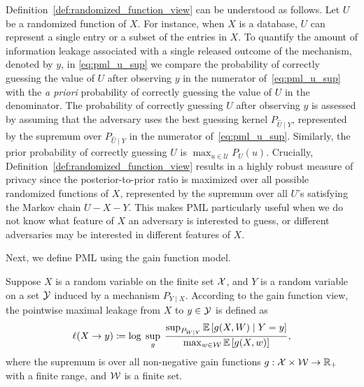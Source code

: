 Definition~\ref{def:randomized_function_view} can be understood as follows. Let $U$ be a randomized function of $X$. For instance, when $X$ is a database, $U$ can represent a single entry or a subset of the entries in $X$. To quantify the amount of information leakage associated with a single released outcome of the mechanism, denoted by $y$, in \eqref{eq:pml_u_sup} we compare the probability of correctly guessing the value of $U$ after observing $y$ in the numerator of~\eqref{eq:pml_u_sup} with the \emph{a priori} probability of correctly guessing the value of $U$ in the denominator. The probability of correctly guessing $U$ after observing $y$ is assessed by assuming that the adversary uses the best guessing kernel $P_{\hat U \mid Y}$, represented by the supremum over $P_{\hat U \mid Y}$ in the numerator of~\eqref{eq:pml_u_sup}. Similarly, the prior probability of correctly guessing $U$ is $\max_{u \in \mathcal{U}} P_U(u)$. Crucially, Definition~\ref{def:randomized_function_view} results in a highly robust measure of privacy since the posterior-to-prior ratio is maximized over all possible randomized functions of $X$, represented by the supremum over all $U$'s satisfying the Markov chain $U-X-Y$. This makes PML particularly useful when we do not know what feature of $X$ an adversary is interested to guess, or different adversaries may be interested in different features of $X$. 

Next, we define PML using the gain function model. 
\begin{definition}
\label{def:gain_function_view}
Suppose $X$ is a random variable on the finite set $\mathcal{X}$, and $Y$ is a random variable on a set $\mathcal{Y}$ induced by a mechanism $P_{Y \mid X}$. 
According to the gain function view, the pointwise maximal leakage from $X$ to $y \in \mathcal{Y}$ is defined as
\begin{equation}
\label{eq:g-leakage}
    \ell(X\to y) \coloneqq \log \; \sup_g \; \frac{\sup_{P_{W \mid Y}} \mathbb{E} \left[g(X,W) \mid Y=y \right]}{\max_{w \in \mathcal{W}} \mathbb{E}\left[g(X, w)\right]},
\end{equation}
where the supremum is over all non-negative gain functions $g: \mathcal{X} \times \mathcal{W} \to \mathbb{R}_+$ with a finite range, and $\mathcal{W}$ is a finite set.  
\end{definition}

